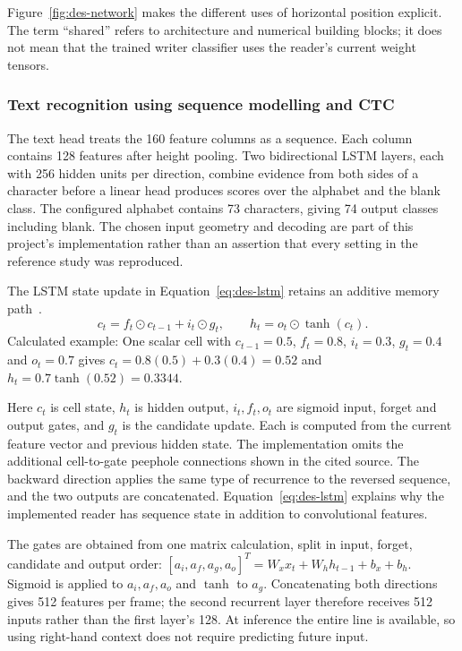 Figure~\ref{fig:des-network} makes the different uses of horizontal position explicit. The term ``shared'' refers to architecture and numerical building blocks; it does not mean that the trained writer classifier uses the reader's current weight tensors.


\subsubsection{Text recognition using sequence modelling and CTC}
The text head treats the 160 feature columns as a sequence. Each column contains 128 features after height pooling. Two bidirectional LSTM layers, each with 256 hidden units per direction, combine evidence from both sides of a character before a linear head produces scores over the alphabet and the blank class. The configured alphabet contains 73 characters, giving 74 output classes including blank. The chosen input geometry and decoding are part of this project's implementation rather than an assertion that every setting in the reference study was reproduced.


The LSTM state update in Equation~\ref{eq:des-lstm} retains an additive memory path~\cite[p.~5, Eqs.~(9)--(11)]{graves2013}.
\begin{equation}
c_t=f_t\odot c_{t-1}+i_t\odot g_t,\qquad
h_t=o_t\odot\tanh(c_t).
\label{eq:des-lstm}
\end{equation}
Calculated example: One scalar cell with $c_{t-1}=0.5$, $f_t=0.8$, $i_t=0.3$, $g_t=0.4$ and $o_t=0.7$ gives $c_t=0.8(0.5)+0.3(0.4)=0.52$ and $h_t=0.7\tanh(0.52)=0.3344$.

Here $c_t$ is cell state, $h_t$ is hidden output, $i_t,f_t,o_t$ are sigmoid input, forget and output gates, and $g_t$ is the candidate update. Each is computed from the current feature vector and previous hidden state. The implementation omits the additional cell-to-gate peephole connections shown in the cited source. The backward direction applies the same type of recurrence to the reversed sequence, and the two outputs are concatenated. Equation~\ref{eq:des-lstm} explains why the implemented reader has sequence state in addition to convolutional features.

The gates are obtained from one matrix calculation, split in input, forget, candidate and output order: $[a_i,a_f,a_g,a_o]^T=W_xx_t+W_hh_{t-1}+b_x+b_h$. Sigmoid is applied to $a_i,a_f,a_o$ and $\tanh$ to $a_g$. Concatenating both directions gives 512 features per frame; the second recurrent layer therefore receives 512 inputs rather than the first layer's 128. At inference the entire line is available, so using right-hand context does not require predicting future input.

